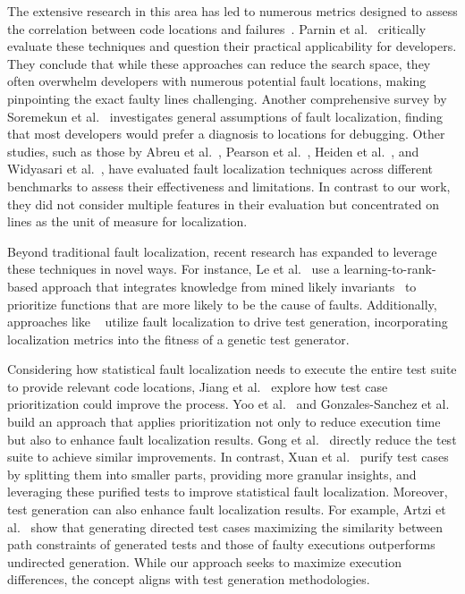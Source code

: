 The extensive research in this area has led to numerous metrics designed to assess the correlation between code locations and failures~\cite{daniel2013sbfl,landsberg2015sfl,naish2011sbfl}.
Parnin et al.~\cite{parnin2011automated} critically evaluate these techniques and question their practical applicability for developers.
They conclude that while these approaches can reduce the search space, they often overwhelm developers with numerous potential fault locations, making pinpointing the exact faulty lines challenging.
Another comprehensive survey by Soremekun et al.~\cite{soremekun2023evaluating} investigates general assumptions of fault localization, finding that most developers would prefer a diagnosis to locations for debugging.
Other studies, such as those by Abreu et al.~\cite{abreu2009practical}, Pearson et al.~\cite{pearson2017sfl}, Heiden et al.~\cite{heidengkkhfl19}, and Widyasari et al.~\cite{widyasari2022sfl}, have evaluated fault localization techniques across different benchmarks to assess their effectiveness and limitations.
In contrast to our work, they did not consider multiple features in their evaluation but concentrated on lines as the unit of measure for localization.

Beyond traditional fault localization, recent research has expanded to leverage these techniques in novel ways.
For instance, Le et al.~\cite{lelgg16} use a learning-to-rank-based approach that integrates knowledge from mined likely invariants~\cite{ernstpgmptx07} to prioritize functions that are more likely to be the cause of faults.
Additionally, approaches like \ENTBUG{}~\cite{camposafd13} utilize fault localization to drive test generation, incorporating localization metrics into the fitness of a genetic test generator.

Considering how statistical fault localization needs to execute the entire test suite to provide relevant code locations, Jiang et al.~\cite{jiangzctc12} explore how test case prioritization could improve the process.
Yoo et al.~\cite{yoo2013priorization} and Gonzales-Sanchez et al.~\cite{gonzalez-sanchezagg11} build an approach that applies prioritization not only to reduce execution time but also to enhance fault localization results.
Gong et al.~\cite{gongwsm13} directly reduce the test suite to achieve similar improvements.
In contrast, Xuan et al.~\cite{xuanm14b} purify test cases by splitting them into smaller parts, providing more granular insights, and leveraging these purified tests to improve statistical fault localization.
Moreover, test generation can also enhance fault localization results.
For example, Artzi et al.~\cite{artzidtp10b} show that generating directed test cases maximizing the similarity between path constraints of generated tests and those of faulty executions outperforms undirected generation.
While our approach seeks to maximize execution differences, the concept aligns with test generation methodologies.

